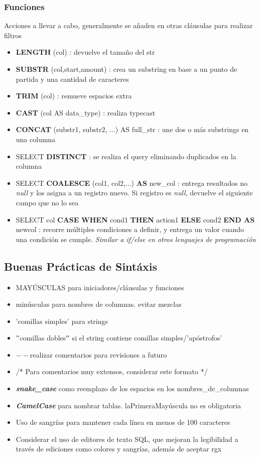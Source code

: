 \subsubsection{Funciones}
Acciones a llevar a cabo, generalmente se añaden en otras cláusulas para realizar filtros
\begin{itemize}
    \item {\textbf{LENGTH} (col) : devuelve el tamaño del \gls{str}}
    \item {\textbf{SUBSTR} (col,start,amount) : crea un substring en base a un punto de partida y una cantidad de caracteres}
    \item {\textbf{TRIM} (col) : remueve espacios extra}
    \item {\textbf{CAST} (col AS data\_type) : realiza \gls{typecast}}
    \item {\textbf{CONCAT} (substr1, substr2, ...) AS full\_str : une dos o más substrings en una columna}
    \item {SELECT \textbf{DISTINCT} : se realiza el query eliminando duplicados en la columna}
    \item {SELECT \textbf{COALESCE} (col1, col2,...) \textbf{AS} new\_col : entrega resultados no \textit{null} y los asigna a un registro nuevo. Si registro es \textit{null}, devuelve el siguiente campo que no lo sea}
    \item {SELECT col \textbf{CASE} \textbf{WHEN} cond1 \textbf{THEN} action1 \textbf{ELSE} cond2 \textbf{END AS} newcol : recorre múltiples condiciones a definir, y entrega un valor cuando una condición se cumple. \textit{Similar a if/else en otros lenguajes de programación}}
\end{itemize}


\subsection{Buenas Prácticas de Sintáxis}
\begin{itemize}
    \item {MAYÚSCULAS para iniciadores/cláusulas y funciones}
    \item {minúsculas para nombres de columnas. evitar mezclas}
    \item {'comillas simples' para strings}
    \item {${"}$comillas dobles${"}$ si el string contiene comillas simples/'apóstrofos'}
    \item {${--}$realizar comentarios para revisiones a futuro}
    \item{/* Para comentarios muy extensos, considerar este formato */}
    \item {\textbf{\textit{snake\_case}} como reemplazo de los espacios en los nombres\_de\_columnas}
    \item {\textbf{\textit{CamelCase}} para nombrar tablas. laPrimeraMayúscula no es obligatoria}
    \item {Uso de sangrías para mantener cada línea en menos de 100 caracteres}
    \item {Considerar el uso de editores de texto SQL, que mejoran la legibilidad a través de ediciones como colores y sangrías, además de aceptar \gls{rgx}}
\end{itemize}

